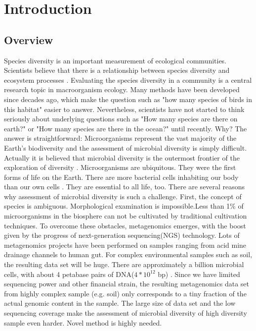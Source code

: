 \chapter{Introduction}

\section{Overview}
Species diversity is an important measurement of ecological communities. 
Scientists believe that there is a relationship between species diversity and 
ecosystem processes \cite{Loreau:2001aa}. Evaluating the species diversity in a
community is a central research topic in macroorganism ecology. Many methods 
have been developed since decades ago, which make the question such as "how many 
species of birds in this habitat" easier to answer. Nevertheless, scientists 
have not started to think seriously about underlying questions such as "How many 
species are there on earth?" \cite{May:1988aa} or "How many species are there 
in the ocean?" \cite{Mora:2011aa} until recently. Why? The answer is 
straightforward: Microorganisms represent the vast majority of the Earth's 
biodiversity and the assessment of microbial diversity is simply difficult. 
Actually it is believed that microbial diversity is the outermost frontier of 
the exploration of diversity \cite{magurran2011biological}. Microorganisms are 
ubiquitous. They were the first forms of life on the Earth. There are more 
bacterial cells inhabiting our body than our own cells \cite{Savage:1977aa}.
They are essential to all life, too. There are several reasons why assessment 
of microbial diversity is such a challenge. First, the concept of species is 
ambiguous. Morphological examination is impossible.Less than 1\% of 
microorganisms  in the biosphere can not be cultivated by traditional cultivation
techniques\cite{Curtis:2002aa}. To overcome these obstacles, 
metagenomics emerges, with the boost given by the progress of next-generation 
sequencing(NGS) technology. Lots of metagenomics projects have been performed on 
samples ranging from acid mine drainage channels to human gut. For complex 
environmental samples 
such as soil, the resulting data set will be huge. There are approximately a 
billion microbial cells, with about 4 petabase pairs of DNA($4*{10}^{12}$ bp) \cite{Zarraonaindia:2013aa}. 
Since we have limited sequencing power and other financial strain, the 
resulting metagenomics data set from highly complex sample (e.g. soil) only 
corresponds to a tiny fraction of the actual genomic content in the sample. 
The large size of data set and the low sequencing coverage make the assessment of 
microbial diversity of high diversity sample even harder. Novel method is 
highly needed. 



